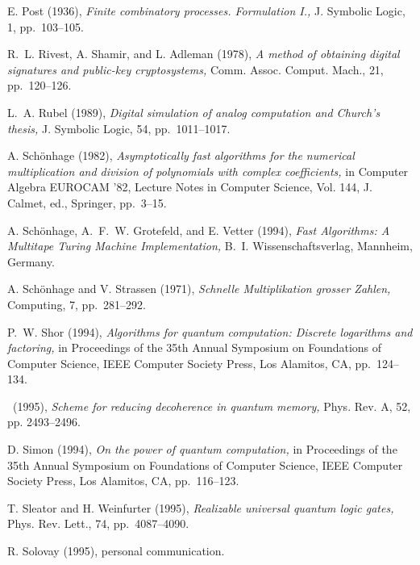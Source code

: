 {\begin{thebibliography}{}
 {\sc E. Post} (1936), {\em Finite 
combinatory processes.  Formulation {\rm I}.,}
{J. Symbolic Logic,}  {1,} 
pp.~103--105.

  {\sc R.~L. Rivest, A. Shamir, and 
L. Adleman} (1978), {\em A method of obtaining digital signatures and 
public-key cryptosystems,} {Comm. Assoc. Comput. Mach.,} {21,}  pp.~120--126.

  {\sc L.~A. Rubel} (1989),
{\em Digital simulation of analog computation and Church's thesis,}
{J. Symbolic Logic,} {54,} pp.~1011--1017.

 {\sc A. Sch\"onhage} 
(1982), {\em Asymptotically fast algorithms for the numerical multiplication
and division of polynomials with complex coefficients,} in {Computer
Algebra EUROCAM '82,} Lecture Notes in Computer Science, Vol. 144,
J. Calmet, ed., Springer, pp.~3--15.

 {\sc A. Sch\"onhage, 
A.~F.~W. Grotefeld, and E. Vetter} (1994), {\em Fast Algorithms{\rm :} 
A Multitape Turing Machine Implementation,} B.~I. Wissenschaftsverlag, 
Mannheim, Germany.

 {\sc A. Sch\"onhage and 
V. Strassen} (1971), {\em Schnelle Multiplikation grosser Zahlen,} 
{Computing,} {7,} pp.~281--292.

 {\sc P.~W. Shor} (1994), {\em Algorithms for 
quantum computation{\rm :} Discrete logarithms and factoring,} in 
{Proceedings of the 35th Annual Symposium on Foundations of Computer 
Science,}  IEEE Computer Society Press, Los Alamitos, CA, pp.~124--134.

 \sameauthor\  (1995), {\em Scheme for reducing
decoherence in quantum memory,} {Phys. Rev. A,} 52, pp. 2493--2496.

 {\sc D. Simon} (1994), {\em On the power of 
quantum computation,} in {Proceedings of the 35th Annual Symposium on 
Foundations of Computer Science,} IEEE Computer Society Press, 
Los Alamitos, CA, pp.~116--123.

 {\sc T. Sleator and H. 
Weinfurter} (1995), {\em Realizable universal quantum logic gates,} 
{Phys. Rev. Lett.,} {74,} pp.~4087--4090.

  {\sc R. Solovay} (1995), personal 
communication.


\end{thebibliography}}
